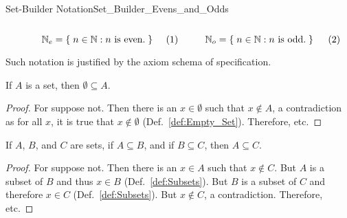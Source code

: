 \begin{lexample}{Set-Builder Notation}{Set_Builder_Evens_and_Odds}
                \begin{subequations}
                    \begin{minipage}[b]{0.49\textwidth}
                        \centering
                        \begin{equation}
                            \mathbb{N}_{e}=\{\;n\in\mathbb{N}:
                                               n\textrm{ is even.}\;\}
                        \end{equation}
                    \end{minipage}
                    \hfill
                    \begin{minipage}[b]{0.49\textwidth}
                        \centering
                        \begin{equation}
                            \mathbb{N}_{o}=\{\;n\in\mathbb{N}:
                                               n\textrm{ is odd.}\;\}
                        \end{equation}
                    \end{minipage}
                \end{subequations}
                \par\vspace{2.5ex}
                Such notation is justified by the axiom schema of specification.
            \end{lexample}
            \begin{theorem}
                \label{thm:Emptyset_Is_Subset}%
                If $A$ is a set, then $\emptyset\subseteq{A}$.
            \end{theorem}
            \begin{proof}
                For suppose not. Then there is an $x\in\emptyset$ such that
                $x\notin{A}$, a contradiction as for all $x$, it is true that
                $x\notin\emptyset$ (Def.~\ref{def:Empty_Set}). Therefore, etc.
            \end{proof}
            \begin{theorem}
                \label{thm:Subset_is_Transitive}%
                If $A$, $B$, and $C$ are sets, if $A\subseteq{B}$, and if
                $B\subseteq{C}$, then $A\subseteq{C}$.
            \end{theorem}
            \begin{proof}
                For suppose not. Then there is an $x\in{A}$ such that
                $x\notin{C}$. But $A$ is a subset of $B$ and thus $x\in{B}$
                (Def.~\ref{def:Subsets}). But $B$ is a subset of $C$ and
                therefore $x\in{C}$ (Def.~\ref{def:Subsets}). But $x\notin{C}$,
                a contradiction. Therefore, etc.
            \end{proof}
